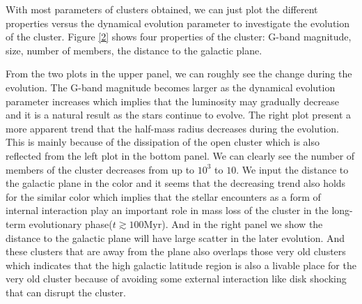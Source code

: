 \documentclass[modern]{aastex63}
\begin{document}

With most parameters of clusters obtained, we can just plot the different properties versus the dynamical evolution parameter to investigate the evolution of the cluster. 
Figure \ref{2} shows four properties of the cluster: G-band magnitude, size, number of members, the distance to the galactic plane.

From the two plots in the upper panel, we can roughly see the change during the evolution. The G-band magnitude becomes larger as the dynamical evolution parameter increases which implies that the luminosity may gradually decrease and it is a natural result as the stars continue to evolve. The right plot present a more apparent trend that the half-mass radius decreases during the evolution. This is mainly because of the dissipation of the open cluster which is also reflected from the left plot in the bottom panel. We can clearly see the number of members of the cluster decreases from up to $10^3$ to $10$. We input the distance to the galactic plane in the color and it seems that the decreasing trend also holds for the similar color which implies that the stellar encounters as a form of internal interaction play an important role in mass loss of the cluster in the long-term evolutionary phase($t\gtrsim100\mathrm{Myr}$). And in the right panel we show the distance to the galactic plane will have large scatter in the later evolution. And these clusters that are away from the plane also overlaps those very old clusters which indicates that the high galactic latitude region is also a livable place for the very old cluster because of avoiding some external interaction like disk shocking that can disrupt the cluster.
\end{document}
